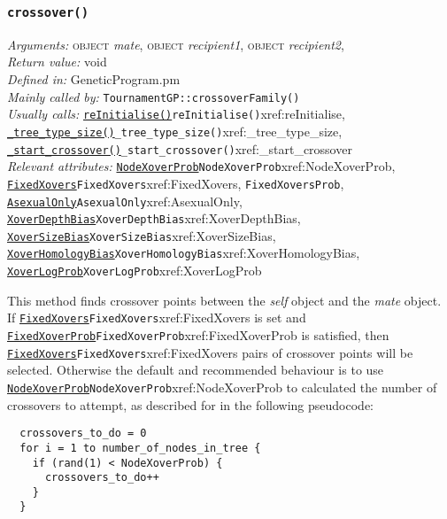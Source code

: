 \documentclass[a4paper]{article}
\begin{document}
\subsubsection{\texttt{crossover()}}\label{xref:crossover}
\begin{flushleft}
\textit{Arguments:} \textsc{object} \textit{mate}, \textsc{object} \textit{recipient1}, \textsc{object} \textit{recipient2}, \\
\textit{Return value:} void\\
\textit{Defined in:} GeneticProgram.pm\\
\textit{Mainly called by:} \texttt{TournamentGP::crossoverFamily()}\\
\textit{Usually calls:} \hyperref[no]{\texttt{reInitialise()}}{\texttt{reInitialise()}}{xref:reInitialise}, \hyperref[no]{\texttt{\_tree\_type\_size()}}{\texttt{\_tree\_type\_size()}}{xref:_tree_type_size}, \hyperref[no]{\texttt{\_start\_crossover()}}{\texttt{\_start\_crossover()}}{xref:_start_crossover}\\
\textit{Relevant attributes:} \hyperref[no]{\texttt{NodeXoverProb}}{\texttt{NodeXoverProb}}{xref:NodeXoverProb}, \hyperref[no]{\texttt{FixedXovers}}{\texttt{FixedXovers}}{xref:FixedXovers}, \texttt{FixedXoversProb}, \hyperref[no]{\texttt{AsexualOnly}}{\texttt{AsexualOnly}}{xref:AsexualOnly}, \hyperref[no]{\texttt{XoverDepthBias}}{\texttt{XoverDepthBias}}{xref:XoverDepthBias}, \hyperref[no]{\texttt{XoverSizeBias}}{\texttt{XoverSizeBias}}{xref:XoverSizeBias}, \hyperref[no]{\texttt{XoverHomologyBias}}{\texttt{XoverHomologyBias}}{xref:XoverHomologyBias}, \hyperref[no]{\texttt{XoverLogProb}}{\texttt{XoverLogProb}}{xref:XoverLogProb}
\end{flushleft}

This method finds crossover points between the \textit{self} object
and the \textit{mate} object.  If \hyperref[no]{\texttt{FixedXovers}}{\texttt{FixedXovers}}{xref:FixedXovers} is set and
\hyperref[no]{\texttt{FixedXoverProb}}{\texttt{FixedXoverProb}}{xref:FixedXoverProb} is satisfied, then \hyperref[no]{\texttt{FixedXovers}}{\texttt{FixedXovers}}{xref:FixedXovers} pairs
of crossover points will be selected.  Otherwise the default and
recommended behaviour is to use \hyperref[no]{\texttt{NodeXoverProb}}{\texttt{NodeXoverProb}}{xref:NodeXoverProb} to calculated
the number of crossovers to attempt, as described for in the following
pseudocode:

\begin{verbatim}
  crossovers_to_do = 0
  for i = 1 to number_of_nodes_in_tree {
    if (rand(1) < NodeXoverProb) {
      crossovers_to_do++
    }
  }
\end{verbatim}
\end{document}
